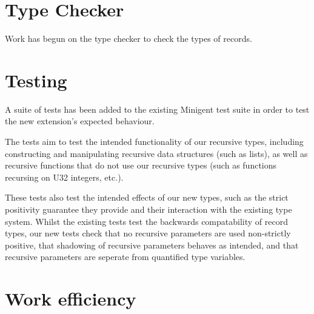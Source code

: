 \section{Type Checker}

Work has begun on the type checker to check the types of records.


\section{Testing}

A suite of tests has been added to the existing Minigent test suite in order to test the new extension's 
expected behaviour.

The tests aim to test the intended functionality of our recursive types, including constructing and manipulating
recursive data structures (such as lists), as well as recursive functions that do not use our recursive types 
(such as functions recursing on U32 integers, etc.).

These tests also test the intended effects of our new types, such as the strict positivity guarantee they provide
and their interaction with the existing type system. Whilst the existing tests test the backwards compatability of
record types, our new tests check that no recursive parameters are used non-strictly positive, that shadowing of recursive
parameters behaves as intended, and that recursive parameters are seperate from quantified type variables.


\section{Work efficiency}

